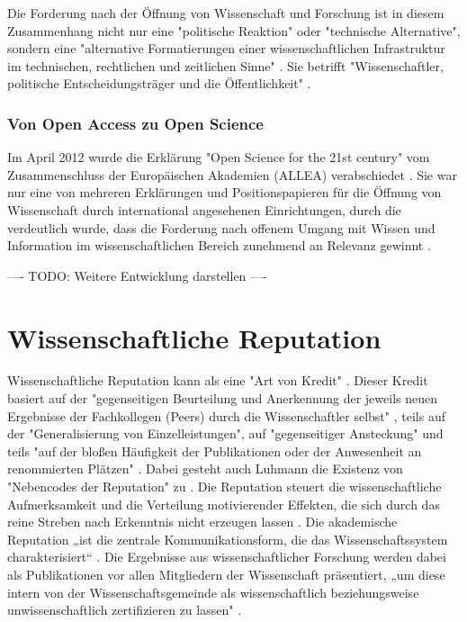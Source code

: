 Die Forderung nach der Öffnung von Wissenschaft und Forschung ist in diesem Zusammenhang nicht nur eine "politische Reaktion" oder "technische Alternative", sondern eine "alternative Formatierungen einer wissenschaftlichen Infrastruktur im technischen, rechtlichen und zeitlichen Sinne" \cite{kelty_2004}. Sie betrifft "Wissenschaftler, politische Entscheidungsträger und die Öffentlichkeit" \cite{Scheliga_2014}.

\subsubsection{Von Open Access zu Open Science}

Im April 2012 wurde die Erklärung "Open Science for the 21st century" vom Zusammenschluss der Europäischen Akademien (ALLEA) verabschiedet \cite{ALLEA_2012}. Sie war nur eine von mehreren Erklärungen und Positionspapieren für die Öffnung von Wissenschaft durch international angesehenen Einrichtungen, durch die verdeutlich wurde, dass die Forderung nach offenem Umgang mit Wissen und Information im wissenschaftlichen Bereich zunehmend an Relevanz gewinnt \cite{schulze_2013_open}.

---- TODO: Weitere Entwicklung darstellen ----

\section{Wissenschaftliche Reputation}

Wissenschaftliche Reputation kann als eine "Art von Kredit" \cite{luhmann_1970_selbststeuerung}. Dieser Kredit basiert auf der "gegenseitigen Beurteilung und Anerkennung der jeweils neuen Ergebnisse der Fachkollegen (Peers) durch die Wissenschaftler selbst"\cite{Hanekop_2014} \cite{suchen_Hornbostel_2006}, teils auf der "Generalisierung von Einzelleistungen", auf "gegenseitiger Ansteckung" und teils "auf der bloßen Häufigkeit der Publikationen oder der Anwesenheit an renommierten Plätzen" \cite{luhmann_1970_selbststeuerung}. Dabei gesteht auch Luhmann die Existenz von "Nebencodes der Reputation" zu \cite{schmoch_2003_hochschulforschung}. Die Reputation steuert die wissenschaftliche Aufmerksamkeit und die Verteilung motivierender Effekten, die sich durch das reine Streben nach Erkenntnis nicht erzeugen lassen \cite{suchen_luhmann}. Die akademische Reputation „ist die zentrale Kommunikationsform, die das Wissenschaftssystem charakterisiert“ \cite{Rutenfranz_1997}. Die Ergebnisse aus wissenschaftlicher Forschung werden dabei als Publikationen vor allen Mitgliedern der Wissenschaft präsentiert, „um diese intern von der Wissenschaftsgemeinde als wissenschaftlich beziehungsweise unwissenschaftlich zertifizieren zu lassen" \cite{Rutenfranz_1997}.


